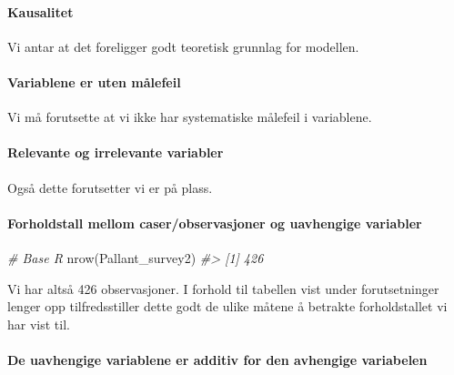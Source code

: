 \documentclass[
]{article}
\newenvironment{Shaded}{\begin{snugshade}}{\end{snugshade}}
\newcommand{\CommentTok}[1]{\textcolor[rgb]{0.56,0.35,0.01}{\textit{#1}}}
\newcommand{\FunctionTok}[1]{\textcolor[rgb]{0.00,0.00,0.00}{#1}}
\newcommand{\NormalTok}[1]{#1}
\begin{document}
\hypertarget{kausalitet-1}{%
\paragraph{Kausalitet}\label{kausalitet-1}}

Vi antar at det foreligger godt teoretisk grunnlag for modellen.

\hypertarget{variablene-er-uten-muxe5lefeil-1}{%
\paragraph{Variablene er uten målefeil}\label{variablene-er-uten-muxe5lefeil-1}}

Vi må forutsette at vi ikke har systematiske målefeil i variablene.

\hypertarget{relevante-og-irrelevante-variabler-1}{%
\paragraph{Relevante og irrelevante variabler}\label{relevante-og-irrelevante-variabler-1}}

Også dette forutsetter vi er på plass.

\hypertarget{forholdstall-mellom-caserobservasjoner-og-uavhengige-variabler-1}{%
\paragraph{Forholdstall mellom caser/observasjoner og uavhengige variabler}\label{forholdstall-mellom-caserobservasjoner-og-uavhengige-variabler-1}}

\begin{Shaded}
\begin{Highlighting}[]
\CommentTok{\# Base R}
\FunctionTok{nrow}\NormalTok{(Pallant\_survey2)}
\CommentTok{\#\textgreater{} [1] 426}
\end{Highlighting}
\end{Shaded}

Vi har altså 426 observasjoner. I forhold til tabellen vist under forutsetninger lenger opp tilfredsstiller dette godt de ulike måtene å betrakte forholdstallet vi har vist til.

\hypertarget{de-uavhengige-variablene-er-additiv-for-den-avhengige-variabelen-1}{%
\paragraph{De uavhengige variablene er additiv for den avhengige variabelen}\label{de-uavhengige-variablene-er-additiv-for-den-avhengige-variabelen-1}}
\end{document}
